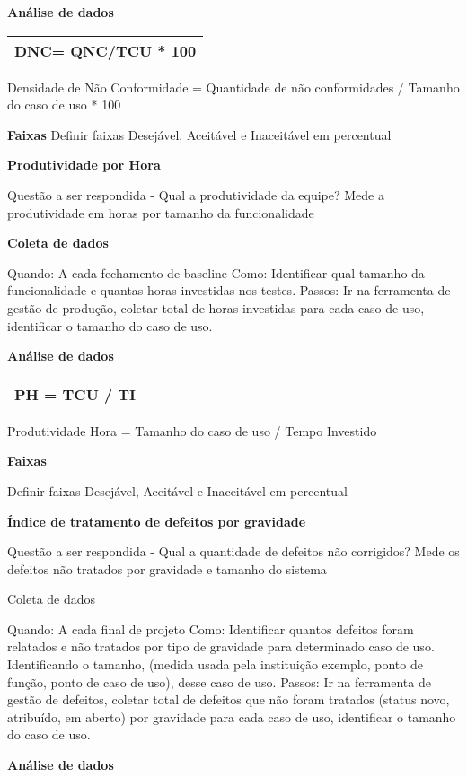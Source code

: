 \textbf{Análise de dados}

\begin{tabular}{|l|}
\hline
DNC= QNC/TCU * 100 \\ 
\hline
\end{tabular}

Densidade de Não Conformidade = Quantidade de não conformidades / Tamanho do caso de uso * 100

\textbf{Faixas} Definir faixas Desejável, Aceitável e Inaceitável em percentual

\textbf{Produtividade por Hora}

Questão a ser respondida - Qual a produtividade da equipe? Mede a produtividade em horas por tamanho da funcionalidade

\textbf{Coleta de dados}

Quando: A cada fechamento de baseline Como: Identificar qual tamanho da funcionalidade e quantas horas investidas nos testes. Passos: Ir na ferramenta de gestão de produção, coletar total de horas investidas para cada  caso de uso, identificar o tamanho do caso de uso.

\textbf{Análise de dados}

\begin{tabular}{|l|}
\hline
PH = TCU / TI \\ 
\hline
\end{tabular}

Produtividade Hora = Tamanho do caso de uso / Tempo Investido

\textbf{Faixas}

Definir faixas Desejável, Aceitável e Inaceitável em percentual

\textbf{Índice de tratamento de defeitos por gravidade}

Questão a ser respondida - Qual a quantidade de defeitos não corrigidos? Mede os defeitos não tratados por gravidade e tamanho do sistema

Coleta de dados

Quando: A cada final de projeto Como: Identificar quantos defeitos foram relatados e não tratados por tipo de gravidade para determinado caso de uso. Identificando o tamanho, (medida usada pela instituição exemplo, ponto de função, ponto de caso de uso), desse caso de uso. Passos: Ir na ferramenta de gestão de defeitos, coletar total de defeitos que não foram tratados (status novo, atribuído, em aberto) por gravidade para cada caso de uso, identificar o tamanho do caso de uso.

\textbf{Análise de dados}

